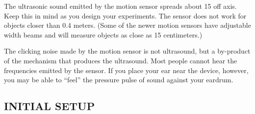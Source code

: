 The ultrasonic sound emitted by the motion sensor spreads about 15{\degree} off axis.  Keep this in mind as you design your experiments.  The sensor does not work for objects closer than 0.4 meters.  (Some of the newer motion sensors have adjustable width beams and will measure objects as close as 15 centimeters.)

The clicking noise made by the motion sensor is not ultrasound, but a by-product of the mechanism that produces the ultrasound.  Most people cannot hear the frequencies emitted by the sensor.  If you place your ear near the device, however, you may be able to ``feel'' the pressure pulse of sound against your eardrum.

\subsection*{INITIAL SETUP}

